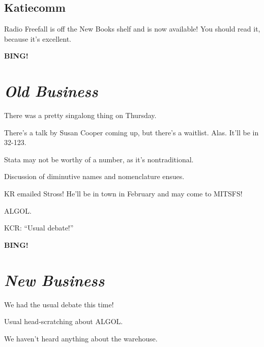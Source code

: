 \documentclass[10pt]{article}
\newcommand{\bing}{{\bf BING!} }
\newcommand{\goto}[1]{\bing \vskip 12pt \section*{{\em{#1}}}}
\begin{document}
\subsection*{Katiecomm}

Radio Freefall is off the New Books shelf and is now available!  You should read it, because it's excellent.







\goto{Old Business}

There was a pretty singalong thing on Thursday.

There's a talk by Susan Cooper coming up, but there's a waitlist.  Alas.  It'll be in 32-123.

Stata may not be worthy of a number, as it's nontraditional.

Discussion of diminutive names and nomenclature ensues.

KR emailed Stross!  He'll be in town in February and may come to MITSFS!

ALGOL.

KCR:  ``Usual debate!''

\goto{New Business}

We had the usual debate this time!

Usual head-scratching about ALGOL.

We haven't heard anything about the warehouse.
\end{document}
